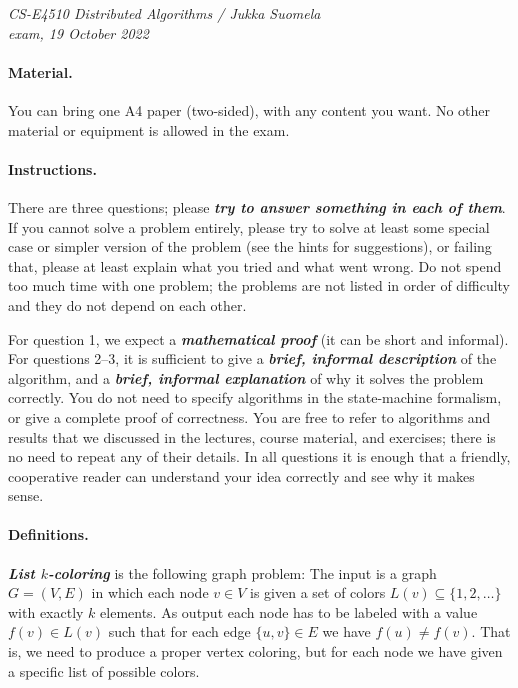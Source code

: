 \documentclass[12pt,a4paper]{article}
\newcommand{\cemph}[1]{\textbf{\emph{\boldmath #1}}}
\begin{document}
\noindent
\emph{CS-E4510 Distributed Algorithms / Jukka Suomela\\
exam, 19 October 2022}

\paragraph{Material.}

You can bring one A4 paper (two-sided), with any content you want. No other material or equipment is allowed in the exam.

\paragraph{Instructions.}

There are three questions; please \cemph{try to answer something in each of them}. If you cannot solve a problem entirely, please try to solve at least some special case or simpler version of the problem (see the hints for suggestions), or failing that, please at least explain what you tried and what went wrong. Do not spend too much time with one problem; the problems are not listed in order of difficulty and they do not depend on each other.

For question 1, we expect a \cemph{mathematical proof} (it can be short and informal). For questions 2--3, it is sufficient to give a \cemph{brief, informal description} of the algorithm, and a \cemph{brief, informal explanation} of why it solves the problem correctly. You do not need to specify algorithms in the state-machine formalism, or give a complete proof of correctness. You are free to refer to algorithms and results that we discussed in the lectures, course material, and exercises; there is no need to repeat any of their details. In all questions it is enough that a friendly, cooperative reader can understand your idea correctly and see why it makes sense.

\paragraph{Definitions.}

\cemph{List $k$-coloring} is the following graph problem: The input is a graph $G = (V,E)$ in which each node $v \in V$ is given a set of colors $L(v) \subseteq \{1, 2, \dotsc\}$ with exactly $k$ elements. As output each node has to be labeled with a value $f(v) \in L(v)$ such that for each edge $\{u,v\} \in E$ we have $f(u) \ne f(v)$. That is, we need to produce a proper vertex coloring, but for each node we have given a specific list of possible colors.
\end{document}

